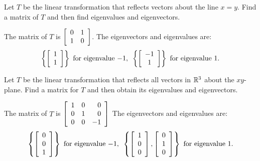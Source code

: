 \documentclass{ximera}
\begin{document}
\begin{problem}
  Let $T$ be the linear transformation that reflects vectors about the
  line $x=y$. Find a matrix of $T$ and then find eigenvalues and
  eigenvectors.
  \begin{solution}
    The matrix of $T$ is $\startmat{rr}
      0 & 1 \\
      1 & 0
    \stopmat$. The eigenvectors and eigenvalues are:
    \begin{equation*}
      \set{\startmat{c}
          1 \\
          1
        \stopmat} ~\mbox{for eigenvalue}~ {-1},
      \quad\set{\startmat{c}
          -1 \\
          1
        \stopmat} ~\mbox{for eigenvalue}~ {1}.
    \end{equation*}
  \end{solution}
\end{problem}

\begin{problem}
  Let $T$ be the linear transformation that reflects all vectors in
  $\R^3$ about the $xy$-plane. Find a matrix for $T$ and then
  obtain its eigenvalues and eigenvectors.
  \begin{solution}
    The matrix of $T$ is $\startmat{rrr}
      1 & 0 & 0 \\
      0 & 1 & 0 \\
      0 & 0 & -1
    \stopmat$
    The eigenvectors and eigenvalues are:
    \begin{equation*}
      \set{\startmat{c}
          0 \\
          0 \\
          1
        \stopmat} ~\mbox{for eigenvalue $-1$},
      \quad\set{\startmat{c}
          1 \\
          0 \\
          0
        \stopmat,
        \startmat{c}
          0 \\
          1 \\
          0
        \stopmat} ~\mbox{for eigenvalue $1$}.
    \end{equation*}
  \end{solution}
\end{problem}
\end{document}
